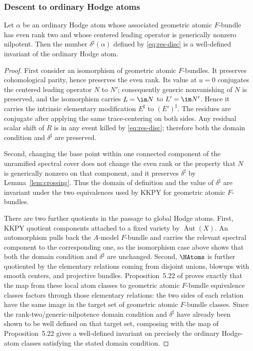 \subsubsection{Descent to ordinary Hodge atoms}

\begin{proposition}\label{prop:atom-invariant}
%
%
%
Let $\alpha$ be an ordinary Hodge atom whose associated geometric atomic
$F$-bundle has even rank two and whose centered leading operator is
generically nonzero nilpotent.  Then the number $\delta^\sharp(\alpha)$
defined by \eqref{eq:res-disc} is a well-defined invariant of the ordinary
Hodge atom.
\end{proposition}

\begin{proof}
First consider an isomorphism of geometric atomic $F$-bundles.  It preserves
cohomological parity, hence preserves the even rank.  Its value at $u=0$
conjugates the centered leading operator $N$ to $N'$; consequently generic
nonvanishing of $N$ is preserved, and the isomorphism carries
$L=\im N$ to $L'=\im N'$.  Hence it carries the intrinsic elementary
modification $E^\sharp$ to $(E')^\sharp$.  The residues are conjugate after
applying the same trace-centering on both sides.  Any residual scalar shift
of $R$ is in any event killed by \eqref{eq:res-disc}; therefore both the
domain condition and $\delta^\sharp$ are preserved.

Second, changing the base point within one connected component of the
unramified spectral cover does not change the even rank or the property that
$N$ is generically nonzero on that component, and it preserves
$\delta^\sharp$ by Lemma~\ref{lem:crossing}.  Thus the domain of definition
and the value of $\delta^\sharp$ are invariant under the two equivalences
used by KKPY for geometric atomic $F$-bundles.

There are two further quotients in the passage to global Hodge atoms.  First,
KKPY quotient components attached to a fixed variety by $\operatorname{Aut}(X)$.
An automorphism pulls back the $A$-model $F$-bundle and carries the relevant
spectral component to the corresponding one, so the isomorphism case above
shows that both the domain condition and $\delta^\sharp$ are unchanged.
Second, $\HAtoms$ is further quotiented by the elementary relations coming
from disjoint unions, blowups with smooth centers, and projective bundles.
Proposition~5.22 of \cite{KKPYY} proves exactly that the map from these local
atom classes to geometric atomic $F$-bundle equivalence classes factors
through those elementary relations: the two sides of each relation have the
same image in the target set of geometric atomic $F$-bundle classes.  Since
the rank-two/generic-nilpotence domain condition and $\delta^\sharp$ have
already been shown to be well defined on that target set, composing with the
map of Proposition~5.22 gives a well-defined invariant on precisely the
ordinary Hodge-atom classes satisfying the stated domain condition.
%
\end{proof}


